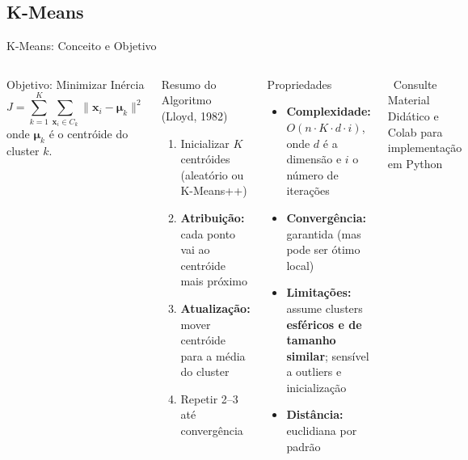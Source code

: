 \documentclass[aspectratio=169]{beamer}
\begin{document}
\subsection{K-Means}

\begin{frame}[shrink=7]{K-Means: Conceito e Objetivo}
    \begin{columns}
        \begin{block}{Objetivo: Minimizar Inércia}
            \[
              J = \sum_{k=1}^{K} \sum_{\mathbf{x}_i \in C_k}
                  \|\mathbf{x}_i - \boldsymbol{\mu}_k\|^2
            \]
            onde $\boldsymbol{\mu}_k$ é o centróide do cluster $k$.
        \end{block}
        \begin{block}{Resumo do Algoritmo (Lloyd, 1982)}
            \begin{enumerate}\footnotesize
                \item Inicializar $K$ centróides (aleatório ou K-Means++)
                \item \textbf{Atribuição:} cada ponto vai ao centróide mais próximo
                \item \textbf{Atualização:} mover centróide para a média do cluster
                \item Repetir 2--3 até convergência
            \end{enumerate}
        \end{block}
        \begin{block}{Propriedades}
            \begin{itemize}\footnotesize
                \item \textbf{Complexidade:} $O(n \cdot K \cdot d \cdot i)$, onde $d$ é a dimensão e $i$ o número de iterações
                \item \textbf{Convergência:} garantida (mas pode ser ótimo local)
                \item \textbf{Limitações:} assume clusters \textbf{esféricos e de tamanho similar}; sensível a outliers e inicialização
                \item \textbf{Distância:} euclidiana por padrão
            \end{itemize}
        \end{block}
        \vspace{0.1cm}
        \centering\tiny \faArrowRight\ Consulte Material Didático e Colab para implementação em Python
    \end{columns}
\end{frame}
\end{document}
